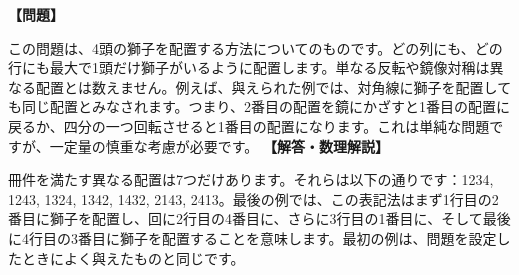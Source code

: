 \documentclass[10pt,a4paper,oneside,openany]{ltjsbook}
\begin{document}
\begin{tcolorbox}[colback=softblue,colframe=primaryblue,title=\textbf{第 296 問：四頭の獅子 （原題: THE FOUR LIONS.）},arc=2mm,boxrule=1pt,breakable]
\textbf{【問題】}\par\vspace{0.3em}
この問題は、4頭の獅子を配置する方法についてのものです。どの列にも、どの行にも最大で1頭だけ獅子がいるように配置します。単なる反転や鏡像対稱は異なる配置とは数えません。例えば、與えられた例では、対角線に獅子を配置しても同じ配置とみなされます。つまり、2番目の配置を鏡にかざすと1番目の配置に戻るか、四分の一つ回転させると1番目の配置になります。これは単純な問題ですが、一定量の慎重な考慮が必要です。
\tcblower
\textbf{【解答・数理解説】}\par\vspace{0.3em}
冊件を満たす異なる配置は7つだけあります。それらは以下の通りです：1234, 1243, 1324, 1342, 1432, 2143, 2413。最後の例では、この表記法はまず1行目の2番目に獅子を配置し、回に2行目の4番目に、さらに3行目の1番目に、そして最後に4行目の3番目に獅子を配置することを意味します。最初の例は、問題を設定したときによく與えたものと同じです。
\end{tcolorbox}
\end{document}
